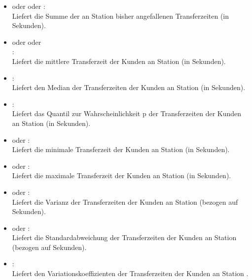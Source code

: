 \begin{itemize}

\item
{} oder  oder :\\
Liefert die Summe der an Station  bisher angefallenen Transferzeiten (in Sekunden).

\item
{} oder  oder\\
:\\
Liefert die mittlere Transferzeit der Kunden an Station  (in Sekunden).

\item
{}:\\
Liefert den Median der Transferzeiten der Kunden an Station  (in Sekunden).

\item
{}:\\
Liefert das Quantil zur Wahrscheinlichkeit p der Transferzeiten der Kunden an Station  (in Sekunden).

\item
{} oder :\\
Liefert die minimale Transferzeit der Kunden an Station  (in Sekunden).

\item
{} oder :\\
Liefert die maximale Transferzeit der Kunden an Station  (in Sekunden).

\item
{} oder :\\
Liefert die Varianz der Transferzeiten der Kunden an Station  (bezogen auf Sekunden).

\item
{} oder :\\
Liefert die Standardabweichung der Transferzeiten der Kunden an Station  (bezogen auf Sekunden).

\item
{}:\\
Liefert den Variationskoeffizienten der Transferzeiten der Kunden an Station .


\end{itemize}
